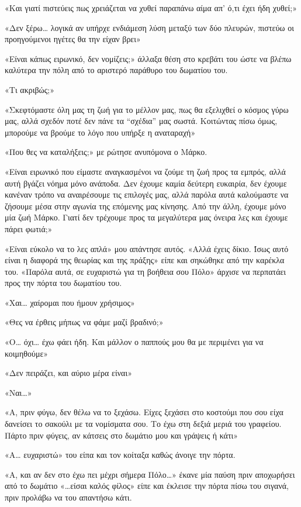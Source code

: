 \documentclass[12pt,twoside, openany]{book}
\begin{document}
«Και γιατί πιστεύεις πως χρειάζεται να χυθεί παραπάνω αίμα απ’ ό,τι έχει ήδη χυθεί;»

«Δεν ξέρω… λογικά αν υπήρχε ενδιάμεση λύση μεταξύ των δύο πλευρών, πιστεύω οι προηγούμενοι ηγέτες θα την είχαν βρει»

«Είναι κάπως ειρωνικό, δεν νομίζεις;» άλλαξα θέση στο κρεβάτι του ώστε να βλέπω καλύτερα την πόλη από το αριστερό παράθυρο του δωματίου του.

«Τι ακριβώς;»

«Σκεφτόμαστε όλη μας τη ζωή για το μέλλον μας, πως θα εξελιχθεί ο κόσμος γύρω μας, αλλά σχεδόν ποτέ δεν πάνε τα “σχέδια” μας σωστά. Κοιτώντας πίσω όμως, μπορούμε να βρούμε το λόγο που υπήρξε η αναταραχή»

«Που θες να καταλήξεις;» με ρώτησε ανυπόμονα ο Μάρκο.

«Είναι ειρωνικό που είμαστε αναγκασμένοι να ζούμε τη ζωή προς τα εμπρός, αλλά αυτή βγάζει νόημα μόνο ανάποδα. Δεν έχουμε καμία δεύτερη ευκαιρία, δεν έχουμε κανέναν τρόπο να αναιρέσουμε τις επιλογές μας, αλλά παρόλα αυτά καλούμαστε να ζήσουμε μέσα στην αγωνία της επόμενης μας κίνησης. Από την άλλη, έχουμε μόνο μία ζωή Μάρκο. Γιατί δεν τρέχουμε προς τα μεγαλύτερα μας όνειρα λες και έχουμε πάρει φωτιά;»

«Είναι εύκολο να το λες απλά» μου απάντησε αυτός. «Αλλά έχεις δίκιο. Ίσως αυτό είναι η διαφορά της θεωρίας και της πράξης» είπε και σηκώθηκε από την καρέκλα του. «Παρόλα αυτά, σε ευχαριστώ για τη βοήθεια σου Πόλο» άρχισε να περπατάει προς την πόρτα του δωματίου του.

«Χαι… χαίρομαι που ήμουν χρήσιμος»

«Θες να έρθεις μήπως να φάμε μαζί βραδινό;»

«Ο… όχι… έχω φάει ήδη. Και μάλλον ο παππούς μου θα με περιμένει για να κοιμηθούμε»

«Δεν πειράζει, και αύριο μέρα είναι»

«Ναι…»

«Α, πριν φύγω, δεν θέλω να το ξεχάσω. Είχες ξεχάσει στο κοστούμι που σου είχα δανείσει το σακούλι με τα νομίσματα σου. Το έχω στη δεξιά μεριά του γραφείου. Πάρτο πριν φύγεις, αν κάτσεις στο δωμάτιο μου και γράψεις ή κάτι»

«Α… ευχαριστώ» του είπα και τον κοίταξα καθώς άνοιγε την πόρτα.

«Α, και αν δεν στο έχω πει μέχρι σήμερα Πόλο…» έκανε μία παύση πριν αποχωρήσει από το δωμάτιο «…είσαι καλός φίλος» είπε και έκλεισε την πόρτα πίσω του σιγανά, πριν προλάβω να του απαντήσω κάτι.
\end{document}
